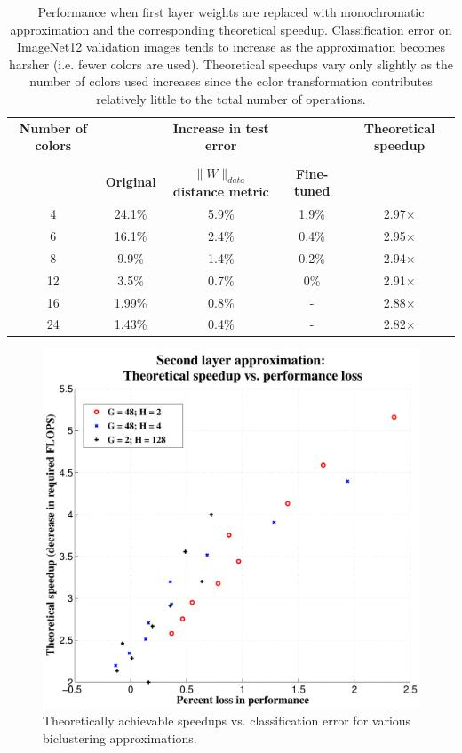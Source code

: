 \documentclass{article} %
\begin{document}
\begin{table}[t]
\small
\centering
\begin{tabular}{ccccc}
\hline
{\bf Number of colors} & & {\bf Increase in test error} & & {\bf Theoretical speedup}\\
& & & &\\
& {\bf Original} & {\bf $\|W\|_{data}$ distance metric} & {\bf Fine-tuned} & \\
\hline
4 & 24.1\% & 5.9\% & 1.9\% & 2.97$\times$ \\
6 & 16.1\% & 2.4\% & 0.4\% & 2.95$\times$ \\
8 & 9.9\% & 1.4\% & 0.2\% & 2.94$\times$\\
12 & 3.5\% & 0.7\% & 0\% & 2.91$\times$\\
16 & 1.99\% & 0.8\% & - & 2.88$\times$\\
24 & 1.43\% & 0.4\% & - & 2.82$\times$\\
\hline 
\end{tabular}
\caption{Performance when first layer weights are replaced with monochromatic approximation and the corresponding theoretical speedup. Classification error on ImageNet12 validation images tends to increase as the approximation becomes harsher (i.e. fewer colors are used). Theoretical speedups vary only slightly as the number of colors used increases since the color transformation contributes relatively little to the total number of operations.} 
\label{table:mono_perf}
\end{table}
\nocite{*}




\begin{figure}[t]
\centering
\begin{minipage}{0.75\textwidth}
  \includegraphics[width=\linewidth]{img/layer2_theoreticalspeedup_vs_performance_loss.pdf} 
\end{minipage}
\caption{Theoretically achievable speedups vs. classification error for various biclustering approximations.}
\label{fig:biclustering_theory}
\end{figure}
\end{document}
